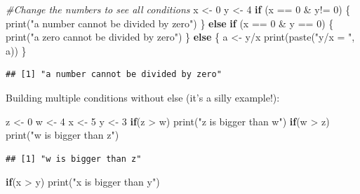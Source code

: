 \documentclass[
]{book}
\newenvironment{Shaded}{\begin{snugshade}}{\end{snugshade}}
\newcommand{\CommentTok}[1]{\textcolor[rgb]{0.56,0.35,0.01}{\textit{#1}}}
\newcommand{\ControlFlowTok}[1]{\textcolor[rgb]{0.13,0.29,0.53}{\textbf{#1}}}
\newcommand{\DecValTok}[1]{\textcolor[rgb]{0.00,0.00,0.81}{#1}}
\newcommand{\FunctionTok}[1]{\textcolor[rgb]{0.00,0.00,0.00}{#1}}
\newcommand{\NormalTok}[1]{#1}
\newcommand{\OtherTok}[1]{\textcolor[rgb]{0.56,0.35,0.01}{#1}}
\newcommand{\SpecialCharTok}[1]{\textcolor[rgb]{0.00,0.00,0.00}{#1}}
\newcommand{\StringTok}[1]{\textcolor[rgb]{0.31,0.60,0.02}{#1}}
\begin{document}
\begin{Shaded}
\begin{Highlighting}[]
\CommentTok{\#Change the numbers to see all conditions}
\NormalTok{x }\OtherTok{\textless{}{-}} \DecValTok{0}
\NormalTok{y }\OtherTok{\textless{}{-}} \DecValTok{4}
\ControlFlowTok{if}\NormalTok{ (x }\SpecialCharTok{==} \DecValTok{0} \SpecialCharTok{\&}\NormalTok{ y}\SpecialCharTok{!=} \DecValTok{0}\NormalTok{) \{}
  \FunctionTok{print}\NormalTok{(}\StringTok{"a number cannot be divided by zero"}\NormalTok{)}
\NormalTok{\} }\ControlFlowTok{else} \ControlFlowTok{if}\NormalTok{ (x }\SpecialCharTok{==} \DecValTok{0} \SpecialCharTok{\&}\NormalTok{ y }\SpecialCharTok{==} \DecValTok{0}\NormalTok{) \{}
  \FunctionTok{print}\NormalTok{(}\StringTok{"a zero cannot be divided by zero"}\NormalTok{)}
\NormalTok{\} }\ControlFlowTok{else}\NormalTok{ \{}
\NormalTok{  a }\OtherTok{\textless{}{-}}\NormalTok{ y}\SpecialCharTok{/}\NormalTok{x }
  \FunctionTok{print}\NormalTok{(}\FunctionTok{paste}\NormalTok{(}\StringTok{"y/x = "}\NormalTok{, a))}
\NormalTok{\}}
\end{Highlighting}
\end{Shaded}

\begin{verbatim}
## [1] "a number cannot be divided by zero"
\end{verbatim}

Building multiple conditions without else (it's a silly example!):

\begin{Shaded}
\begin{Highlighting}[]
\NormalTok{z }\OtherTok{\textless{}{-}} \DecValTok{0}
\NormalTok{w }\OtherTok{\textless{}{-}} \DecValTok{4}
\NormalTok{x }\OtherTok{\textless{}{-}} \DecValTok{5}
\NormalTok{y }\OtherTok{\textless{}{-}} \DecValTok{3}
\ControlFlowTok{if}\NormalTok{(z }\SpecialCharTok{\textgreater{}}\NormalTok{ w) }\FunctionTok{print}\NormalTok{(}\StringTok{"z is bigger than w"}\NormalTok{)}
\ControlFlowTok{if}\NormalTok{(w }\SpecialCharTok{\textgreater{}}\NormalTok{ z) }\FunctionTok{print}\NormalTok{(}\StringTok{"w is bigger than z"}\NormalTok{)}
\end{Highlighting}
\end{Shaded}

\begin{verbatim}
## [1] "w is bigger than z"
\end{verbatim}

\begin{Shaded}
\begin{Highlighting}[]
\ControlFlowTok{if}\NormalTok{(x }\SpecialCharTok{\textgreater{}}\NormalTok{ y) }\FunctionTok{print}\NormalTok{(}\StringTok{"x is bigger than y"}\NormalTok{)}
\end{Highlighting}
\end{Shaded}
\end{document}
